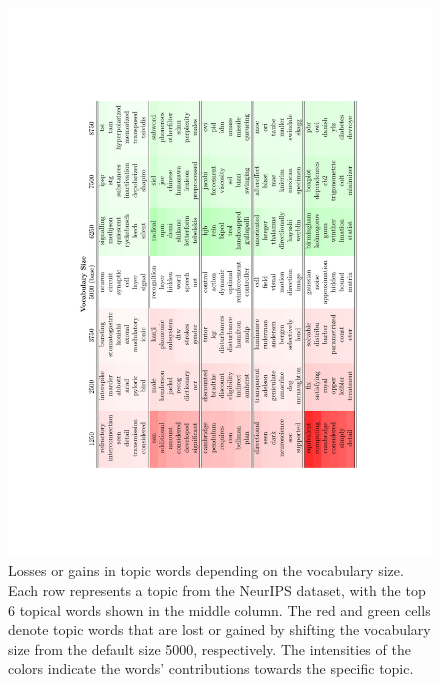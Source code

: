 \begin{figure}[ht]
 	\centering
	\includegraphics[angle=270, width=1.0\textwidth, trim={2.0cm, 4.5cm, 2.0cm,
	4.5cm}]{./lrtm/pics/topWordsFull.pdf}
	\vspace*{-40px}
	\caption{Losses or gains in topic words depending on the vocabulary size. Each
	row represents a topic from the NeurIPS dataset, with the top 6 topical words
	shown in the middle column. The red and green cells denote topic words that
	are lost or gained by shifting the vocabulary size from the default size 5000,
	respectively. The intensities of the colors indicate the words' contributions
	towards the specific topic.} 
	\label{fig:top_words}		
\end{figure}
